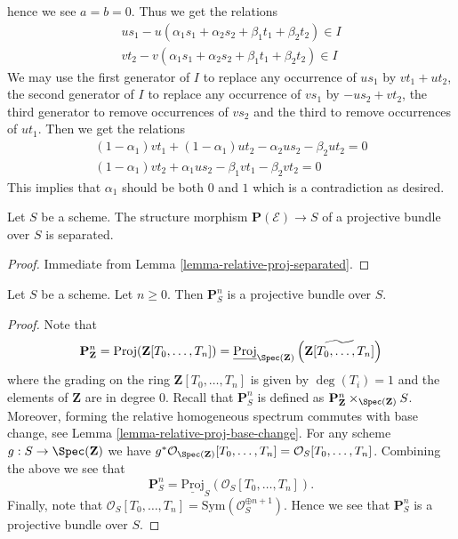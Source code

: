 \begin{example}
hence we see $a = b = 0$. Thus we get the relations
$$
\begin{matrix}
us_1 - u(\alpha_1s_1 + \alpha_2s_2 + \beta_1t_1 + \beta_2t_2)
\in I \\
vt_2 - v(\alpha_1s_1 + \alpha_2s_2 + \beta_1t_1 + \beta_2t_2)
\in I
\end{matrix}
$$
We may use the first generator of $I$ to replace any occurrence of
$us_1$ by $vt_1 + ut_2$, the second generator of $I$ to replace any
occurrence of $vs_1$ by $-us_2 + vt_2$, the third generator
to remove occurrences of $vs_2$ and the third to remove occurrences
of $ut_1$. Then we get the relations
$$
\begin{matrix}
(1 - \alpha_1)vt_1 + (1 - \alpha_1)ut_2 - \alpha_2us_2 - \beta_2ut_2 = 0 \\
(1 - \alpha_1)vt_2 + \alpha_1us_2 - \beta_1vt_1 - \beta_2vt_2 = 0
\end{matrix}
$$
This implies that $\alpha_1$ should be both $0$ and $1$ which is
a contradiction as desired.
\end{example}


\begin{lemma}
\label{lemma-projective-bundle-separated}
Let $S$ be a scheme.
The structure morphism $\mathbf{P}(\mathcal{E}) \to S$ of a
projective bundle over $S$ is separated.
\end{lemma}

\begin{proof}
Immediate from Lemma \ref{lemma-relative-proj-separated}.
\end{proof}

\begin{lemma}
\label{lemma-projective-space-bundle}
Let $S$ be a scheme. Let $n \geq 0$. Then
$\mathbf{P}^n_S$ is a projective bundle over $S$.
\end{lemma}

\begin{proof}
Note that
$$
\mathbf{P}^n_{\mathbf{Z}} =
\text{Proj}(\mathbf{Z}[T_0, \ldots, T_n]) =
\underline{\text{Proj}}_{\Spec(\mathbf{Z})}
\left(\widetilde{\mathbf{Z}[T_0, \ldots, T_n]}\right)
$$
where the grading on the ring $\mathbf{Z}[T_0, \ldots, T_n]$ is given by
$\deg(T_i) = 1$ and the elements of $\mathbf{Z}$ are in degree $0$.
Recall that $\mathbf{P}^n_S$ is defined as
$\mathbf{P}^n_{\mathbf{Z}} \times_{\Spec(\mathbf{Z})} S$.
Moreover, forming the relative homogeneous spectrum commutes with base change,
see Lemma \ref{lemma-relative-proj-base-change}.
For any scheme $g : S \to \Spec(\mathbf{Z})$ we have
$g^*\mathcal{O}_{\Spec(\mathbf{Z})}[T_0, \ldots, T_n]
= \mathcal{O}_S[T_0, \ldots, T_n]$.
Combining the above we see that
$$
\mathbf{P}^n_S = \underline{\text{Proj}}_S(\mathcal{O}_S[T_0, \ldots, T_n]).
$$
Finally, note that
$\mathcal{O}_S[T_0, \ldots, T_n] = \text{Sym}(\mathcal{O}_S^{\oplus n + 1})$.
Hence we see that $\mathbf{P}^n_S$ is a projective bundle over $S$.
\end{proof}



